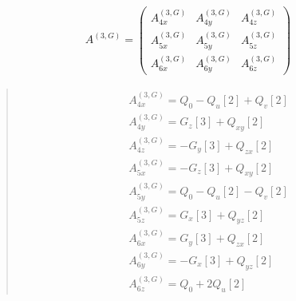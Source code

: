 \documentclass[fleqn,10pt]{jsarticle}
\begin{document}
\begin{align*}
A^{(3,G)} = \begin{pmatrix} A^{(3,G)}_{4x} & A^{(3,G)}_{4y} & A^{(3,G)}_{4z} \\ A^{(3,G)}_{5x} & A^{(3,G)}_{5y} & A^{(3,G)}_{5z} \\ A^{(3,G)}_{6x} & A^{(3,G)}_{6y} & A^{(3,G)}_{6z} \end{pmatrix}
\end{align*}
\begin{quote}
\begin{align*}
& A^{(3,G)}_{4x} = Q_{0} - Q_{u}[2] + Q_{v}[2] \\
& A^{(3,G)}_{4y} = G_{z}[3] + Q_{xy}[2] \\
& A^{(3,G)}_{4z} = - G_{y}[3] + Q_{zx}[2] \\
& A^{(3,G)}_{5x} = - G_{z}[3] + Q_{xy}[2] \\
& A^{(3,G)}_{5y} = Q_{0} - Q_{u}[2] - Q_{v}[2] \\
& A^{(3,G)}_{5z} = G_{x}[3] + Q_{yz}[2] \\
& A^{(3,G)}_{6x} = G_{y}[3] + Q_{zx}[2] \\
& A^{(3,G)}_{6y} = - G_{x}[3] + Q_{yz}[2] \\
& A^{(3,G)}_{6z} = Q_{0} + 2 Q_{u}[2]
\end{align*}
\end{quote}
\end{document}
